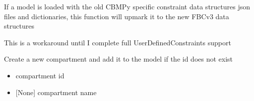 \documentclass[letterpaper,10pt,english]{sphinxmanual}
\begin{document}
\begin{fulllineitems}
\begin{fulllineitems}
\label{\detokenize{modules_doc:cbmpy.CBModel.Model.convertUserConstraintsToUserDefinedConstraints}}
\pysigstartsignatures
{}
\pysigstopsignatures
\sphinxAtStartPar
If a model is loaded with the old CBMPy specific constraint data structures json files and dictionaries, this function will
upmark it to the new FBCv3 data structures

\end{fulllineitems}


\begin{fulllineitems}
\label{\detokenize{modules_doc:cbmpy.CBModel.Model.copyUserDefinedConstraintsToUserConstraints}}
\pysigstartsignatures
{}
\pysigstopsignatures
\sphinxAtStartPar
This is a workaround until I complete full UserDefinedConstraints support

\end{fulllineitems}


\begin{fulllineitems}
\label{\detokenize{modules_doc:cbmpy.CBModel.Model.createCompartment}}
\pysigstartsignatures
{}
\pysigstopsignatures
\sphinxAtStartPar
Create a new compartment and add it to the model if the id does not exist
\begin{itemize}
\item {} 
\sphinxAtStartPar
{} compartment id

\item {} 
\sphinxAtStartPar
{} {[}None{]} compartment name


\end{itemize}
\end{fulllineitems}
\end{fulllineitems}
\end{document}
